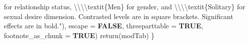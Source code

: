 \documentclass[
  bookmarksnumbered]{article}
\newenvironment{Shaded}{\begin{snugshade}}{\end{snugshade}}
\newcommand{\AttributeTok}[1]{\textcolor[rgb]{0.80,0.80,0.80}{#1}}
\newcommand{\ConstantTok}[1]{\textcolor[rgb]{0.86,0.64,0.64}{\textbf{#1}}}
\newcommand{\FunctionTok}[1]{\textcolor[rgb]{0.94,0.94,0.56}{#1}}
\newcommand{\NormalTok}[1]{\textcolor[rgb]{0.80,0.80,0.80}{#1}}
\newcommand{\SpecialCharTok}[1]{\textcolor[rgb]{0.86,0.64,0.64}{#1}}
\newcommand{\StringTok}[1]{\textcolor[rgb]{0.80,0.58,0.58}{#1}}
\begin{document}
\begin{Shaded}
\begin{Highlighting}[]
\StringTok{                              for relationship status, }\SpecialCharTok{\textbackslash{}\textbackslash{}\textbackslash{}\textbackslash{}}\StringTok{textit\{Men\} for gender, }
\StringTok{                              and }\SpecialCharTok{\textbackslash{}\textbackslash{}\textbackslash{}\textbackslash{}}\StringTok{textit\{Solitary\} for  sexual desire dimension.}
\StringTok{                              Contrasted levels are in square brackets.}
\StringTok{                              Significant effects are in bold."}\NormalTok{),}
             \AttributeTok{escape =} \ConstantTok{FALSE}\NormalTok{,}
             \AttributeTok{threeparttable =} \ConstantTok{TRUE}\NormalTok{,}
             \AttributeTok{footnote\_as\_chunk =} \ConstantTok{TRUE}\NormalTok{)}
    \FunctionTok{return}\NormalTok{(modTab)}
\NormalTok{\}}


\end{Highlighting}
\end{Shaded}
\end{document}
